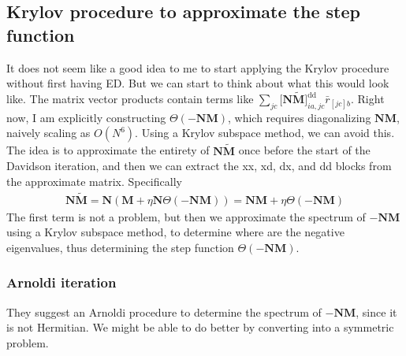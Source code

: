 \subsection{Krylov procedure to approximate the step function}
It does not seem like a good idea to me to start applying the Krylov procedure without first having ED. But we can start to think about what this would look like. The matrix vector products contain terms like $\sum_{jc}\bigl[ \mathbf{N} \tilde{\mathbf{M}}\bigr]_{i a, j c}^{\mathrm{dd}} \bar{r}_{[j c] b}$. Right now, I am explicitly constructing $\Theta(-\bm{N}\bm{M})$, which requires diagonalizing $\bm{N}\bm{M}$, naively scaling as $O(N^6)$. Using a Krylov subspace method, we can avoid this. The idea is to approximate the entirety of $\mathbf{N} \tilde{\mathbf{M}}$ once before the start of the Davidson iteration, and then we can extract the xx, xd, dx, and dd blocks from the approximate matrix. Specifically
\begin{align}
\bm{N}\tilde{\bm{M}} = \bm{N}\left(\bm{M}+\eta \bm{N} \Theta(-\bm{N}\bm{M})\right) = \bm{N}\bm{M} + \eta \Theta(-\bm{N}\bm{M})
\end{align}
The first term is not a problem, but then we approximate the spectrum of $-\bm{N}\bm{M}$ using a Krylov subspace method, to determine where are the negative eigenvalues, thus determining the step function $\Theta(-\bm{N}\bm{M})$.
\subsubsection{Arnoldi iteration}
They suggest an Arnoldi procedure to determine the spectrum of $-\bm{N}\bm{M}$, since it is not Hermitian. We might be able to do better by converting into a symmetric problem. 

